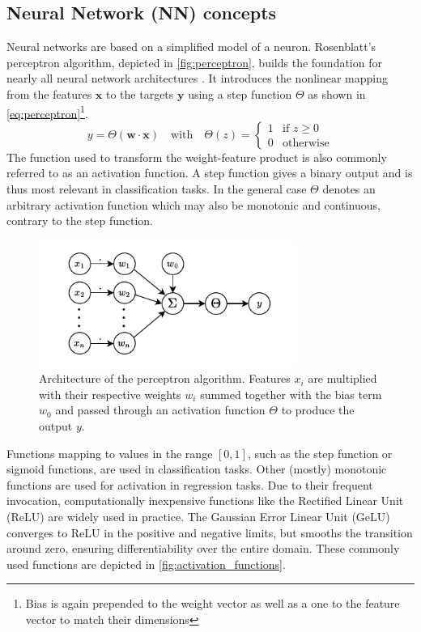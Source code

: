 \subsection{Neural Network (NN) concepts}
\label{subsec:nn_concepts}
Neural networks are based on a simplified model of a neuron. Rosenblatt's perceptron algorithm, depicted in \autoref{fig:perceptron}, builds the foundation for nearly all neural network architectures \parencite{ref:rosenblatt1958perceptron}. It introduces the nonlinear mapping from the features $\mathbf{x}$ to the targets $\mathbf{y}$ using a step function $\Theta$ as shown in \autoref{eq:perceptron}\footnote{Bias is again prepended to the weight vector as well as a one to the feature vector to match their dimensions}.
\begin{equation}
    \label{eq:perceptron}
    y = \Theta(\mathbf{w} \cdot \mathbf{x}) \quad \text{with} \quad
    \Theta(z) =
    \begin{cases}
        1 & \text{if } z \geq 0 \\
        0 & \text{otherwise}
    \end{cases}
\end{equation}
The function used to transform the weight-feature product is also commonly referred to as an activation function. A step function gives a binary output and is thus most relevant in classification tasks. In the general case $\Theta$ denotes an arbitrary activation function which may also be monotonic and continuous, contrary to the step function.\\
\begin{figure}[H]
    \centering
    \includegraphics[width=0.75\textwidth]{../fig/background/Perceptron.pdf}
    \caption[Perceptron]{Architecture of the perceptron algorithm. Features $x_i$ are multiplied with their respective weights $w_i$ summed together with the bias term $w_0$ and passed through an activation function $\Theta$ to produce the output $y$.}
    \label{fig:perceptron}
\end{figure}
Functions mapping to values in the range $[0, 1]$, such as the step function or sigmoid functions, are used in classification tasks. Other (mostly) monotonic functions are used for activation in regression tasks. Due to their frequent invocation, computationally inexpensive functions like the Rectified Linear Unit (ReLU) are widely used in practice. The Gaussian Error Linear Unit (GeLU) converges to ReLU in the positive and negative limits, but smooths the transition around zero, ensuring differentiability over the entire domain. These commonly used functions are depicted in \autoref{fig:activation_functions}. 

